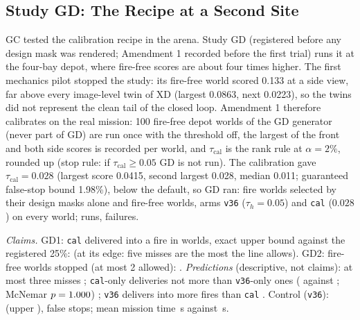 \documentclass[conference]{IEEEtran}
\begin{document}
\subsection{Study GD: The Recipe at a Second Site}\label{sec:moved-gd}
GC tested the calibration recipe in the arena. Study GD (registered before any design mask was rendered; Amendment 1 recorded before the first trial) runs it at the four-bay depot, where fire-free scores are about four times higher. The first mechanics pilot stopped the study: its fire-free world scored 0.133 at a side view, far above every image-level twin of XD (largest 0.0863, next 0.0223), so the twins did not represent the clean tail of the closed loop. Amendment 1 therefore calibrates on the real mission: 100 fire-free depot worlds of the GD generator (never part of GD) are run once with the threshold off, the largest of the front and both side scores is recorded per world, and $\tau_{\mathrm{cal}}$ is the rank rule at $\alpha=2\%$, rounded up (stop rule: if $\tau_{\mathrm{cal}}\ge0.05$ GD is not run). The calibration gave $\tau_{\mathrm{cal}}=0.028$ (largest score 0.0415, second largest 0.028, median 0.011; guaranteed false-stop bound 1.98\%), below the default, so GD ran: \DepCalWorlds{} fire worlds selected by their design masks alone and \DepCalPlain{} fire-free worlds, arms \texttt{v36} ($\tau_h=0.05$) and \texttt{cal} ($0.028$) on every world; \DepCalN{} runs, \DepCalFailed{} failures.

\emph{Claims.} GD1: \texttt{cal} delivered into a fire in \DepCalCal{} worlds, exact upper bound \DepCalCalUpper{} against the registered 25\%: \DepCalOneHolds{} (at its edge: five misses are the most the line allows). GD2: \DepCalFalseStops{} fire-free worlds stopped (at most 2 allowed): \DepCalTwoHolds. \emph{Predictions} (descriptive, not claims): at most three misses \DepCalPredOne; \texttt{cal}-only deliveries not more than \texttt{v36}-only ones (\DepCalOnlyCal{} against \DepCalOnlyV; McNemar $p=1.000$) \DepCalPredTwo; \texttt{v36} delivers into more fires than \texttt{cal} \DepCalPredThree. Control (\texttt{v36}): \DepCalVThreeSix{} (upper \DepCalVThreeSixUpper), \DepCalFalseStopFreeV{} false stops; mean mission time \DepCalTimeCal\,s against \DepCalTimeVThreeSix\,s.
\end{document}
